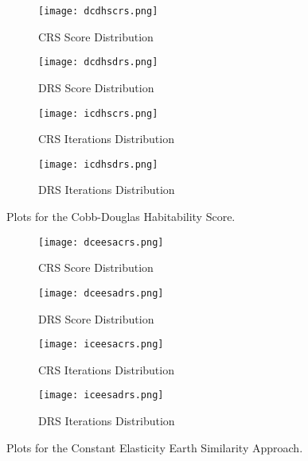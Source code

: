 \documentclass[10pt]{article}
\begin{document}
\begin{figure}
  \centering
  \begin{subfigure}[b]{0.38\textwidth}
    \texttt{[image: dcdhscrs.png]}
    \caption{CRS Score Distribution}\label{fig:distcdcrs}
  \end{subfigure}
  \quad
  \begin{subfigure}[b]{0.38\textwidth}
    \texttt{[image: dcdhsdrs.png]}
    \caption{DRS Score Distribution}\label{fig:distcddrs}
  \end{subfigure}

  \begin{subfigure}[b]{0.38\textwidth}
    \texttt{[image: icdhscrs.png]}
    \caption{CRS Iterations Distribution}\label{fig:itercdcrs}
  \end{subfigure}
  \quad
  \begin{subfigure}[b]{0.38\textwidth}
    \texttt{[image: icdhsdrs.png]}
    \caption{DRS Iterations Distribution}\label{fig:itercddrs}
  \end{subfigure}
  \caption{Plots for the Cobb-Douglas Habitability Score.}\label{fig:cdhs}
\end{figure}


\begin{figure}
  \centering
  \begin{subfigure}[b]{0.38\textwidth}
    \texttt{[image: dceesacrs.png]}
    \caption{CRS Score Distribution}\label{fig:distcecrs}
  \end{subfigure}
  \quad
  \begin{subfigure}[b]{0.38\textwidth}
    \texttt{[image: dceesadrs.png]}
    \caption{DRS Score Distribution}\label{fig:distcedrs}
  \end{subfigure}

  \begin{subfigure}[b]{0.38\textwidth}
    \texttt{[image: iceesacrs.png]}
    \caption{CRS Iterations Distribution}\label{fig:itercecrs}
  \end{subfigure}
  \quad
  \begin{subfigure}[b]{0.38\textwidth}
    \texttt{[image: iceesadrs.png]}
    \caption{DRS Iterations Distribution}\label{fig:itercedrs}
  \end{subfigure}
  \caption{Plots for the Constant Elasticity Earth Similarity Approach.}\label{fig:ceesa}
\end{figure}
\end{document}
